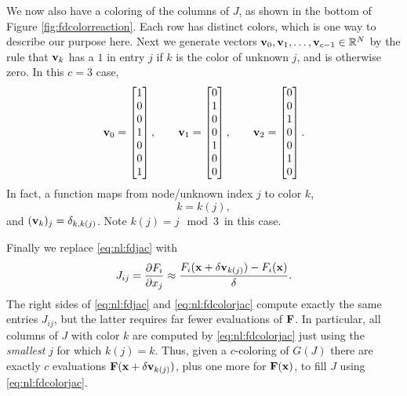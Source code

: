 We now also have a coloring of the columns of $J$, as shown in the bottom of Figure \ref{fig:fdcolorreaction}.  Each row has distinct colors, which is one way to describe our purpose here.  Next we generate vectors $\mathbf{v}_0, \mathbf{v}_1, \dots, \mathbf{v}_{c-1} \in \mathbb{R}^N$ by the rule that $\mathbf{v}_k$ has a $1$ in entry $j$ if $k$ is the color of unknown $j$, and is otherwise zero.  In this $c=3$ case,
\begin{equation}
\mathbf{v}_0 = \begin{bmatrix} 1 \\ 0 \\ 0 \\ 1 \\ 0 \\ 0 \\ 1 \end{bmatrix}, \qquad
\mathbf{v}_1 = \begin{bmatrix} 0 \\ 1 \\ 0 \\ 0 \\ 1 \\ 0 \\ 0 \end{bmatrix}, \qquad
\mathbf{v}_2 = \begin{bmatrix} 0 \\ 0 \\ 1 \\ 0 \\ 0 \\ 1 \\ 0 \end{bmatrix}.
 \label{eq:nl:coloringvecs}
\end{equation}
In fact, a function maps from node/unknown index $j$ to color $k$,
\begin{equation}
k = k(j),  \label{eq:nl:colorfunc}
\end{equation}
and $(\mathbf{v}_k)_j = \delta_{k,k(j)}$.  Note $k(j) = j\mod 3$\, in this case.

Finally we replace \eqref{eq:nl:fdjac} with
\begin{equation}
J_{ij} = \frac{\partial F_i}{\partial x_j} \approx \frac{F_i(\mathbf{x}+\delta \mathbf{v}_{k(j)}) - F_i(\mathbf{x})}{\delta}.  \label{eq:nl:fdcolorjac}
\end{equation}
The right sides of \eqref{eq:nl:fdjac} and \eqref{eq:nl:fdcolorjac} compute exactly the same entries $J_{ij}$, but the latter requires far fewer evaluations of $\mathbf{F}$.  In particular, all columns of $J$ with color $k$ are computed by \eqref{eq:nl:fdcolorjac} just using the \emph{smallest} $j$ for which $k(j)=k$.  Thus, given a $c$-coloring of $G(J)$ there are exactly $c$ evaluations $\mathbf{F}(\mathbf{x}+\delta \mathbf{v}_{k(j)})$, plus one more for $\mathbf{F}(\mathbf{x})$, to fill $J$ using \eqref{eq:nl:fdcolorjac}.

